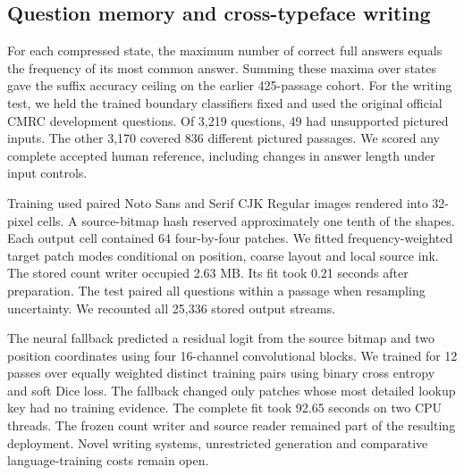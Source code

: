 \documentclass[12pt,a4paper]{article}
\providecommand{\DIFadd}[1]{{\protect\color{blue} \sf #1}} %
\begin{document}
\subsection*{\DIFadd{Question memory and cross-typeface writing}}
\DIFadd{For each compressed state, the maximum number of correct full answers equals
the frequency of its most common answer. Summing these maxima over states
gave the suffix accuracy ceiling on the earlier 425-passage cohort.
For the writing test, we held the trained boundary classifiers fixed and
used the original official CMRC development questions. Of 3,219 questions,
49 had unsupported pictured inputs. The other 3,170 covered 836 different
pictured passages. We scored any complete accepted human reference, including
changes in answer length under input controls.
}

\DIFadd{Training used paired Noto Sans and Serif CJK Regular images rendered into
32-pixel cells. A source-bitmap hash reserved approximately one tenth of
the shapes. Each output cell contained 64 four-by-four patches. We fitted
frequency-weighted target patch modes conditional on position, coarse layout
and local source ink. The stored count writer occupied 2.63 MB. Its fit took
0.21 seconds after preparation. The test paired all questions within a passage
when resampling uncertainty. We recounted all 25,336 stored output streams.
}

\DIFadd{The neural fallback predicted a residual logit from the source bitmap and
two position coordinates using four 16-channel convolutional blocks. We
trained for 12 passes over equally weighted distinct training pairs using
binary cross entropy and soft Dice loss. The fallback changed only patches
whose most detailed lookup key had no training evidence. The complete fit
took 92.65 seconds on two CPU threads. The frozen count writer and source
reader remained part of the resulting deployment. Novel writing systems,
unrestricted generation and comparative language-training costs remain open.
}
\end{document}
